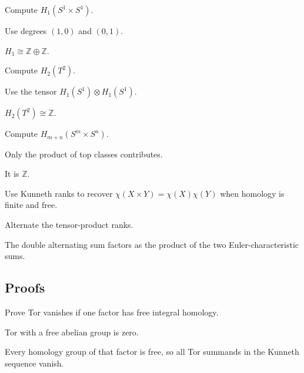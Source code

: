 \begin{exercise}[Torus H1]\label{exr:viii27-ped-02}
Compute $H_1(S^1\times S^1)$.
\end{exercise}
\begin{hint}
Use degrees $(1,0)$ and $(0,1)$.
\end{hint}
\begin{solution}
$H_1\cong\mathbb Z\oplus\mathbb Z$.
\end{solution}

\begin{exercise}[Torus H2]\label{exr:viii27-ped-03}
Compute $H_2(T^2)$.
\end{exercise}
\begin{hint}
Use the tensor $H_1(S^1)\otimes H_1(S^1)$.
\end{hint}
\begin{solution}
$H_2(T^2)\cong\mathbb Z$.
\end{solution}

\begin{exercise}\label{exr:viii27-ped-04}
Compute $H_{m+n}(S^m\times S^n)$.
\end{exercise}
\begin{hint}
Only the product of top classes contributes.
\end{hint}
\begin{solution}
It is $\mathbb Z$.
\end{solution}

\begin{exercise}\label{exr:viii27-ped-05}
Use Kunneth ranks to recover $\chi(X\times Y)=\chi(X)\chi(Y)$ when homology is finite and free.
\end{exercise}
\begin{hint}
Alternate the tensor-product ranks.
\end{hint}
\begin{solution}
The double alternating sum factors as the product of the two Euler-characteristic sums.
\end{solution}

\subsection*{Proofs}

\begin{exercise}\label{exr:viii27-ped-06}
Prove Tor vanishes if one factor has free integral homology.
\end{exercise}
\begin{hint}
Tor with a free abelian group is zero.
\end{hint}
\begin{solution}
Every homology group of that factor is free, so all Tor summands in the Kunneth sequence vanish.
\end{solution}

